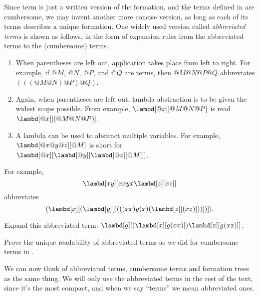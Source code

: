\documentclass[../../../include/open-logic-section]{subfiles}
\begin{document}

Since term is just a written version of the formation, and the terms
defined in \olref[lc][int][syn] are cumbersome, we may invent another more concise version, as
long as each of its terms describes a unique formation. One
widely used version called \emph{abbreviated terms} is shown as
follows, in the form of expansion rules from the abbreviated terms to the (cumbersome) terms.

\begin{enumerate}
\item When parentheses are left out, application takes place from left
  to right. For example, if $@M$, $@N$, $@P$, and $@Q$ are terms, then
  $@M@N@P@Q$ abbreviates $(((@M@N)@P)@Q)$.
\item Again, when parentheses are left out, lambda abstraction is to
  be given the widest scope possible. From example, $\lambd[@x][@M@N@P]$ is
  read $\lambd[@x][(@M@N@P)]$.
\item A lambda can be used to abstract multiple variables. For
  example, $\lambd[@x@y@z][@M]$ is short for
  $\lambd[@x][\lambd[@y][\lambd[@z][@M]]]$.
\end{enumerate}

For example,
\[
\lambd[xy][xxyx \lambd[z][xz]]
\]
abbreviates
\[
(\lambd[x][(\lambd[y][((((xx)y)x)(\lambd[z][(xz)]))])]).
\]

\begin{prob}
  Expand this abbreviated term: $\lambd[g][(\lambd[x][g (x x)]) \lambd[x][g (x x)]]$.
\end{prob}

\begin{prob}
  Prove the unique readability of abbreviated terms as we did for
  cumbersome terms in \olref[lc][int][unq].
\end{prob}

We can now think of abbreviated terms, cumbersome terms and
formation trees as the same
thing. We will only use the abbreviated terms in the rest of the
text, since it's the most compact, and when we say ``terms'' we mean
abbreviated ones.
\end{document}
